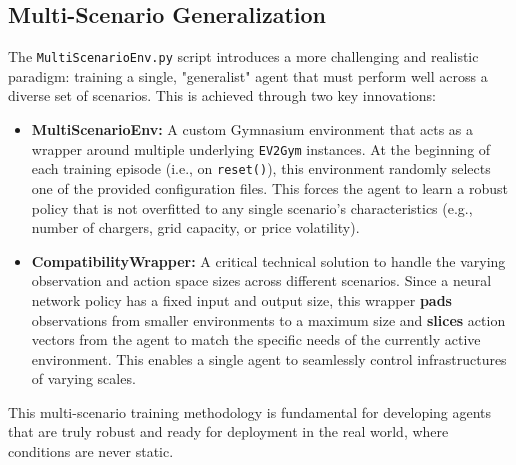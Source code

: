 \subsection{Multi-Scenario Generalization}
The \texttt{MultiScenarioEnv.py} script introduces a more challenging and realistic paradigm: training a single, "generalist" agent that must perform well across a diverse set of scenarios. This is achieved through two key innovations:
\begin{itemize}
    \item \textbf{MultiScenarioEnv:} A custom Gymnasium environment that acts as a wrapper around multiple underlying \texttt{EV2Gym} instances. At the beginning of each training episode (i.e., on \texttt{reset()}), this environment randomly selects one of the provided configuration files. This forces the agent to learn a robust policy that is not overfitted to any single scenario's characteristics (e.g., number of chargers, grid capacity, or price volatility).
    \item \textbf{CompatibilityWrapper:} A critical technical solution to handle the varying observation and action space sizes across different scenarios. Since a neural network policy has a fixed input and output size, this wrapper \textbf{pads} observations from smaller environments to a maximum size and \textbf{slices} action vectors from the agent to match the specific needs of the currently active environment. This enables a single agent to seamlessly control infrastructures of varying scales.
\end{itemize}
This multi-scenario training methodology is fundamental for developing agents that are truly robust and ready for deployment in the real world, where conditions are never static.

